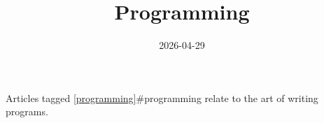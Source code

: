 \documentclass{note}
\title{Programming}
\date{2026-04-29}
\begin{document}
Articles tagged \ref{programming}{#programming} relate to the art of writing programs.
\end{document}
